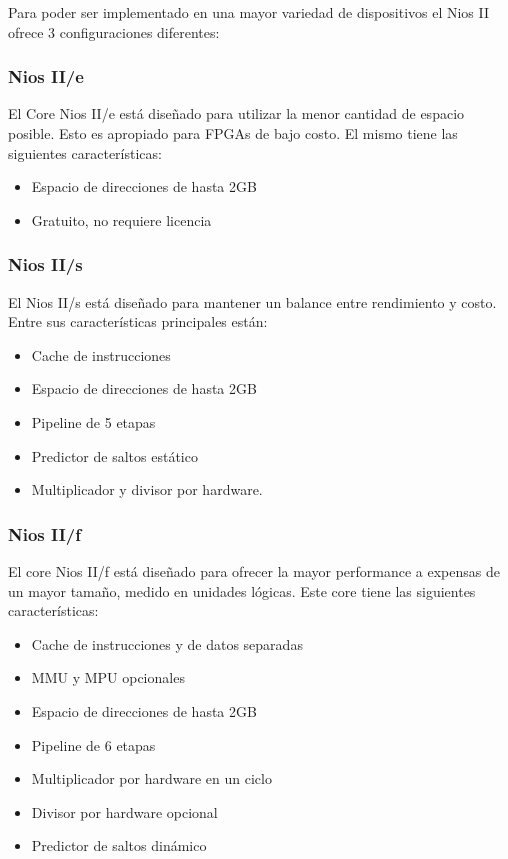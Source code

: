 Para poder ser implementado en una mayor variedad de dispositivos el Nios II ofrece 3 configuraciones diferentes:  

\subsubsection{Nios II/e}
El Core Nios II/e está diseñado para utilizar la menor cantidad de espacio posible. Esto es apropiado para FPGAs de bajo costo. El mismo tiene las siguientes características:
\begin{itemize}
	\item Espacio de direcciones de hasta 2GB
	\item Gratuito, no requiere licencia 
\end{itemize}

\subsubsection{Nios II/s}
El Nios II/s está diseñado para mantener un balance entre rendimiento y costo. Entre sus características principales están:

\begin{itemize}
	\item Cache de instrucciones
	\item Espacio de direcciones de hasta 2GB
	\item Pipeline de 5 etapas
	\item Predictor de saltos estático
	\item Multiplicador y divisor por hardware. 
\end{itemize}

\subsubsection{Nios II/f}
El core Nios II/f está diseñado para ofrecer la mayor performance a expensas de un mayor tamaño, medido en unidades lógicas. Este core tiene las siguientes características:

\begin{itemize}
	\item Cache de instrucciones y de datos separadas
	\item MMU y MPU opcionales
	\item Espacio de direcciones de hasta 2GB
	\item Pipeline de 6 etapas
	\item Multiplicador por hardware en un ciclo
	\item Divisor por hardware opcional
	\item Predictor de saltos dinámico
\end{itemize}

